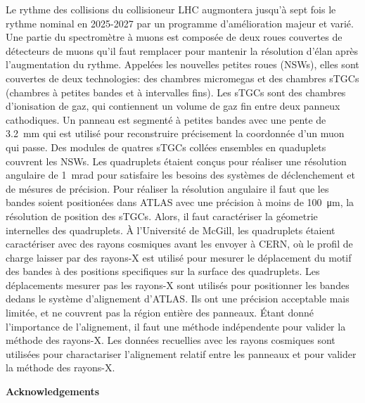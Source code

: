 Le rythme des collisions du collisioneur LHC augmontera jusqu'\`{a} sept fois le rythme nominal en 2025-2027 par un programme d'am\'{e}lioration majeur et vari\'{e}. Une partie du spectrom\`{e}tre \`{a} muons est compos\'{e}e de deux roues couvertes de d\'{e}tecteurs de muons qu'il faut remplacer pour mantenir la r\'{e}solution d'\'{e}lan apr\`{e}s l'augmentation du rythme. Appel\'{e}es les nouvelles petites roues (NSWs), elles sont couvertes de deux technologies: des chambres micromegas et des chambres sTGCs (chambres \`{a} petites bandes et \`{a} intervalles fins). Les sTGCs sont des chambres d'ionisation de gaz, qui contiennent un volume de gaz fin entre deux panneux cathodiques. Un panneau est segment\'{e} \`{a} petites bandes avec une pente de \SI{3.2}{mm} qui est utilis\'{e} pour reconstruire pr\'{e}cisement la coordonn\'{e}e d'un muon qui passe. Des modules de quatres sTGCs coll\'{e}es ensembles en quaduplets couvrent les NSWs. Les quadruplets \'{e}taient con\c{c}us pour r\'{e}aliser une r\'{e}solution angulaire de \SI{1}{mrad} pour satisfaire les besoins des syst\`{e}mes de d\'{e}clenchement et de m\'{e}sures de pr\'{e}cision. Pour r\'{e}aliser la r\'{e}solution angulaire il faut que les bandes soient position\'{e}es dans ATLAS avec une pr\'{e}cision \`{a} moins de \SI{100}{\micro\meter}, la r\'{e}solution de position des sTGCs. Alors, il faut caract\'{e}riser la g\'{e}ometrie internelles des quadruplets. \`{A} l'Universit\'{e} de McGill, les quadruplets \'{e}taient caract\'{e}riser avec des rayons cosmiques avant les envoyer \`{a} CERN, o\`{u} le profil de charge laisser par des rayons-X est utilis\'{e} pour mesurer le d\'{e}placement du motif des bandes \`{a} des positions specifiques sur la surface des quadruplets. Les d\'{e}placements mesurer pas les rayons-X sont utilis\'{e}s pour positionner les bandes dedans le syst\`{e}me d'alignement d'ATLAS. Ils ont une pr\'{e}cision acceptable mais limit\'{e}e, et ne couvrent pas la r\'{e}gion enti\`{e}re des panneaux. \'{E}tant donn\'{e} l'importance de l'alignement, il faut une m\'{e}thode ind\'{e}pendente pour valider la m\'{e}thode des rayons-X. Les donn\'{e}es recuellies avec les rayons cosmiques sont utilis\'{e}es pour charactariser l'alignement relatif entre les panneaux et pour valider la m\'{e}thode des rayons-X.

\cleardoublepage


\begin{center}\textbf{Acknowledgements}\end{center}

